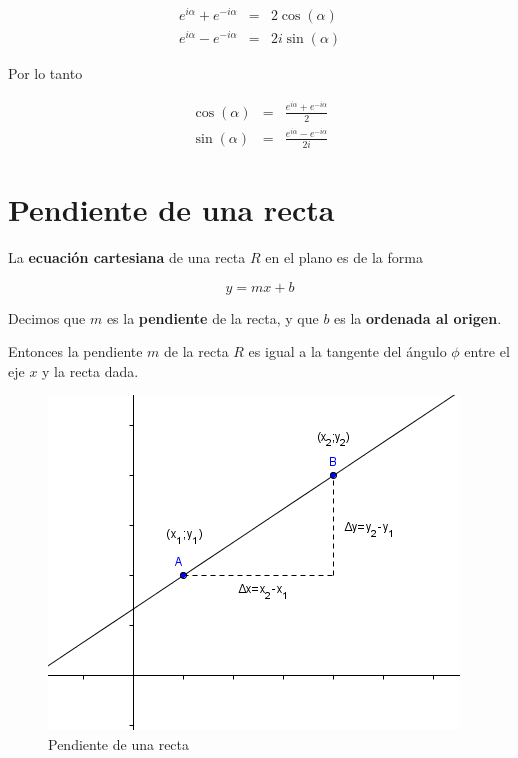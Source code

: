 \begin{eqnarray*}
e^{i \alpha} + e^{-i \alpha} &=& 2 \cos(\alpha) \\
e^{i \alpha} - e^{-i \alpha} &=& 2 i \sin(\alpha)
\end{eqnarray*}

Por lo tanto

\begin{eqnarray*}
\cos(\alpha) &=& \frac{e^{i \alpha} + e^{-i \alpha}}{2} \\
\sin(\alpha) &=& \frac{e^{i \alpha} - e^{-i \alpha}}{2i}
\end{eqnarray*}

\section{Pendiente de una recta} 

\begin{observation}
La \textbf{ecuación cartesiana} de una recta $R$ en el plano es de la forma

$$ y = mx + b$$

Decimos que $m$ es la \textbf{pendiente} de la recta, y que $b$ es la \textbf{ordenada al origen}.

Entonces la pendiente $m$ de la recta $R$ es igual a la tangente del ángulo $\phi$ entre el eje $x$ y la recta dada.
\end{observation}

\begin{figure}[h]
\centering\includegraphics[scale=1]{images/01_precalculo/pendiente_recta.png}
\caption{Pendiente de una recta}
\end{figure}

